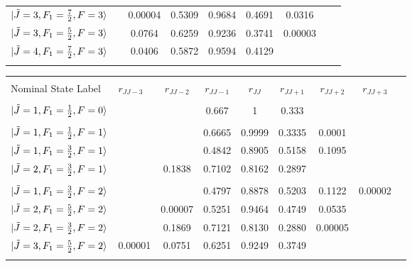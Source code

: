 \documentclass[8pt]{article}
\begin{document}
\begin{table}[]
\begin{tabular}{l l c c c c c c r}
		$\ket{\tilde{J}  = 3, F_1 = \frac{7}{2}, F = 3}$ & & 0.00004 & 0.5309 & 0.9684 & 0.4691 & 0.0316 &  \\ 
		
		$\ket{\tilde{J}  = 3, F_1 = \frac{5}{2}, F = 3}$  & & 0.0764 & 0.6259 & 0.9236 & 0.3741 & 0.00003 &  \\
		
		$\ket{\tilde{J}  = 4, F_1 = \frac{7}{2}, F = 3}$ & & 0.0406 & 0.5872 & 0.9594 & 0.4129 & &  \\
		\\
		\hline
		\hline
	\end{tabular}
\end{table}


\begin{table}[]
	\scriptsize
	
	\begin{tabular}{l l c c c c c c r}
		\hline
		\hline
		\\
		Nominal State Label & $r_{JJ-3}$ &$r_{JJ-2}$ & $r_{JJ-1}$ & $r_{JJ}$ & $r_{JJ+1}$ & $r_{JJ+2}$ & $r_{JJ+3}$ \\
		\hline
		\\
		$\ket{\tilde{J}  = 1, F_1 = \frac{1}{2}, F = 0}$ & &  & 0.667 & 1 & 0.333 & &  \\ 
		\\
		$\ket{\tilde{J}  = 1, F_1 = \frac{1}{2}, F = 1}$ & &   & 0.6665 & 0.9999 & 0.3335 & 0.0001 &   \\
		$\ket{\tilde{J}  = 1, F_1 = \frac{3}{2}, F = 1}$ &  &  & 0.4842 & 0.8905 & 0.5158 & 0.1095 &   \\
		$\ket{\tilde{J}  = 2, F_1 = \frac{3}{2}, F = 1}$ & & 0.1838 & 0.7102 & 0.8162 & 0.2897 & &    \\
		\\
		$\ket{\tilde{J}  = 1, F_1 = \frac{3}{2}, F = 2}$ & & & 0.4797 & 0.8878 & 0.5203 & 0.1122 & 0.00002 \\
		
		$\ket{\tilde{J}  = 2, F_1 = \frac{5}{2}, F = 2}$ & & 0.00007 & 0.5251 & 0.9464 & 0.4749 & 0.0535 &  \\
		
		$\ket{\tilde{J}  = 2, F_1 = \frac{3}{2}, F = 2}$  & & 0.1869 & 0.7121 & 0.8130 & 0.2880 & 0.00005 &  \\
		
		$\ket{\tilde{J}  = 3, F_1 = \frac{5}{2}, F = 2}$ & 0.00001 & 0.0751 & 0.6251 & 0.9249 & 0.3749 &  &  \\
		\\
		

\end{tabular}
\end{table}
\end{document}
